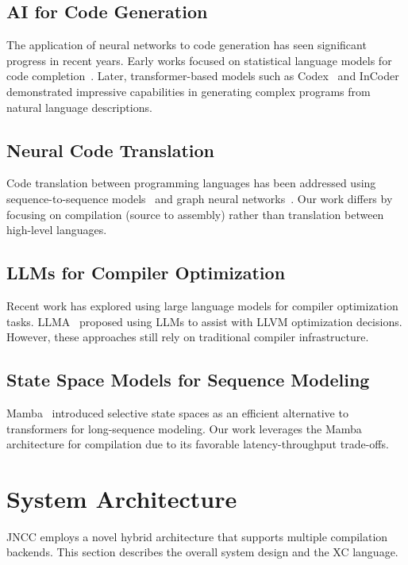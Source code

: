\documentclass[12pt, a4paper, submitted, nofoot]{JNCCtemplate}
\begin{document}
\subsection{AI for Code Generation}

The application of neural networks to code generation has seen significant progress in recent years. Early works focused on statistical language models for code completion~\cite{floyd2019evaluate}. Later, transformer-based models such as Codex~\cite{chen2021Evaluating} and InCoder~\cite{fried2022incoder} demonstrated impressive capabilities in generating complex programs from natural language descriptions.

\subsection{Neural Code Translation}

Code translation between programming languages has been addressed using sequence-to-sequence models~\cite{lachaux2020studying} and graph neural networks~\cite{chen2020graph}. Our work differs by focusing on compilation (source to assembly) rather than translation between high-level languages.

\subsection{LLMs for Compiler Optimization}

Recent work has explored using large language models for compiler optimization tasks. LLMA~\cite{LLMA} proposed using LLMs to assist with LLVM optimization decisions. However, these approaches still rely on traditional compiler infrastructure.

\subsection{State Space Models for Sequence Modeling}

Mamba~\cite{mamba2023} introduced selective state spaces as an efficient alternative to transformers for long-sequence modeling. Our work leverages the Mamba architecture for compilation due to its favorable latency-throughput trade-offs.

\section{System Architecture}

JNCC employs a novel hybrid architecture that supports multiple compilation backends. This section describes the overall system design and the XC language.
\end{document}

